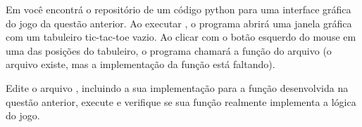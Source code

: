 Em  você encontrá o repositório de um código python para uma
interface gráfica do jogo da questão anterior.
Ao executar , o programa abrirá uma janela gráfica com um tabuleiro tic-tac-toe vazio.
Ao clicar com o botão esquerdo do mouse em uma das posições do tabuleiro, o programa chamará a função
 do arquivo  (o arquivo existe, mas a implementação
da função está faltando).

Edite o arquivo , incluindo a sua implementação para a função desenvolvida na
questão anterior, execute  e verifique se sua função realmente implementa a lógica do jogo.